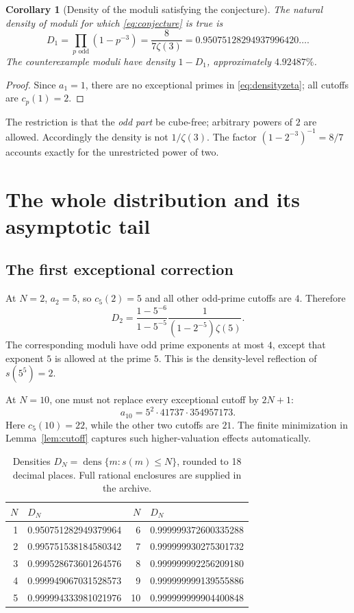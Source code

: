 \documentclass[11pt,a4paper]{article}
\numberwithin{equation}{section}
\newtheorem{corollary}[theorem]{Corollary}
\theoremstyle{definition}
\DeclareMathOperator{\dens}{dens}
\begin{document}
\begin{corollary}[Density of the moduli satisfying the conjecture]
The natural density of moduli for which \eqref{eq:conjecture} is true is
\begin{equation}\label{eq:cubefreedensity}
D_1=\prod_{p\text{ odd}}(1-p^{-3})
=\frac{8}{7\zeta(3)}
=0.95075128294937996420\ldots.
\end{equation}
The counterexample moduli have density $1-D_1$, approximately $4.92487\%$.
\end{corollary}

\begin{proof}
Since $a_1=1$, there are no exceptional primes in
\eqref{eq:densityzeta}; all cutoffs are $c_p(1)=2$.
\end{proof}

The restriction is that the \emph{odd part} be cube-free; arbitrary powers
of $2$ are allowed. Accordingly the density is not $1/\zeta(3)$.
The factor $(1-2^{-3})^{-1}=8/7$ accounts exactly for the unrestricted
power of two.

\section{The whole distribution and its asymptotic tail}
\label{sec:tail}

\subsection{The first exceptional correction}

At $N=2$, $a_2=5$, so $c_5(2)=5$ and all other odd-prime cutoffs are $4$.
Therefore
\begin{equation}\label{eq:D2}
D_2=\frac{1-5^{-6}}{1-5^{-5}}
\frac{1}{(1-2^{-5})\zeta(5)}.
\end{equation}
The corresponding moduli have odd prime exponents at most $4$, except
that exponent $5$ is allowed at the prime $5$. This is the density-level
reflection of $s(5^5)=2$.

At $N=10$, one must not replace every exceptional cutoff by $2N+1$:
\[
a_{10}=5^2\cdot41737\cdot354957173.
\]
Here $c_5(10)=22$, while the other two cutoffs are $21$. The finite
minimization in Lemma~\ref{lem:cutoff} captures such higher-valuation effects
automatically.

\begin{table}[htbp]
\centering
\caption{Densities $D_N=\dens\{m:s(m)\le N\}$, rounded to 18 decimal
places. Full rational enclosures are supplied in the archive.}
\label{tab:densities}
\begin{tabular}{r l r l}
\toprule
$N$ & $D_N$ & $N$ & $D_N$\\
\midrule
1&0.950751282949379964&6&0.999999372600335288\\
2&0.995751538184580342&7&0.999999930275301732\\
3&0.999528673601264576&8&0.999999992256209180\\
4&0.999949067031528573&9&0.999999999139555886\\
5&0.999994333981021976&10&0.999999999904400848\\
\bottomrule
\end{tabular}
\end{table}
\end{document}
